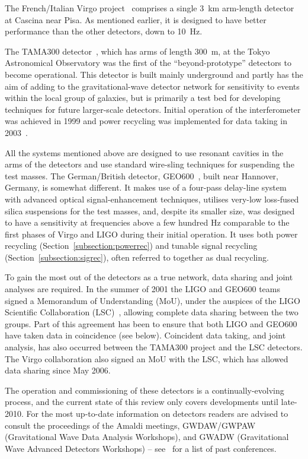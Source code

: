 \documentclass{article}
\begin{document}
The French/Italian Virgo project~\cite{VIRGOweb} comprises a single
3~km arm-length detector at Cascina near Pisa. As mentioned earlier,
it is designed to have better performance than the other detectors,
down to 10~Hz.

The TAMA300 detector~\cite{TAMAweb}, which has arms of length 300~m, at the
Tokyo Astronomical Observatory was the first of the ``beyond-prototype''
detectors to become operational. This detector is built mainly underground and
partly has the aim of adding to the gravitational-wave detector network for
sensitivity to events within the local group of galaxies, but is primarily a
test bed for developing techniques for future larger-scale detectors. Initial
operation of the interferometer was achieved in 1999 and power recycling was
implemented for data taking in 2003~\cite{Arai:2003}.

All the systems mentioned above are designed to use resonant cavities in the
arms of the detectors and use standard wire-sling techniques for suspending the
test masses. The German/British detector, GEO600~\cite{GEOweb}, built near
Hannover, Germany, is somewhat different. It makes use of a four-pass delay-line
system with advanced optical signal-enhancement techniques, utilises very-low
loss-fused silica suspensions for the test masses, and, despite its smaller size,
was designed to have a sensitivity at frequencies above a few hundred Hz
comparable to the first phases of Virgo and LIGO during their initial operation.
It uses both power recycling (Section~\ref{subsection:powerrec}) and tunable signal
recycling (Section~\ref{subsection:sigrec}), often referred to together as dual
recycling.

To gain the most out of the detectors as a true network, data sharing and joint
analyses are required. In the summer of 2001 the LIGO and GEO600 teams signed a
Memorandum of Understanding (MoU), under the auspices of the LIGO Scientific
Collaboration (LSC)~\cite{LSCweb}, allowing complete data sharing between the
two groups. Part of this agreement has been to ensure that both LIGO and
GEO600 have taken data in coincidence (see below). Coincident data taking, and
joint analysis, has also occurred between the TAMA300 project and the LSC
detectors. The Virgo collaboration also signed an MoU with the LSC, which has
allowed data sharing since May 2006.

The operation and commissioning of these detectors is a continually-evolving
process, and the current state of this review only covers developments until
late-2010. For the most up-to-date information on detectors readers are advised
to consult the proceedings of the Amaldi meetings, GWDAW/GWPAW (Gravitational
Wave Data Analysis Workshops), and GWADW (Gravitational Wave Advanced Detectors
Workshops) -- see~\cite{confs} for a list of past conferences.
\end{document}
